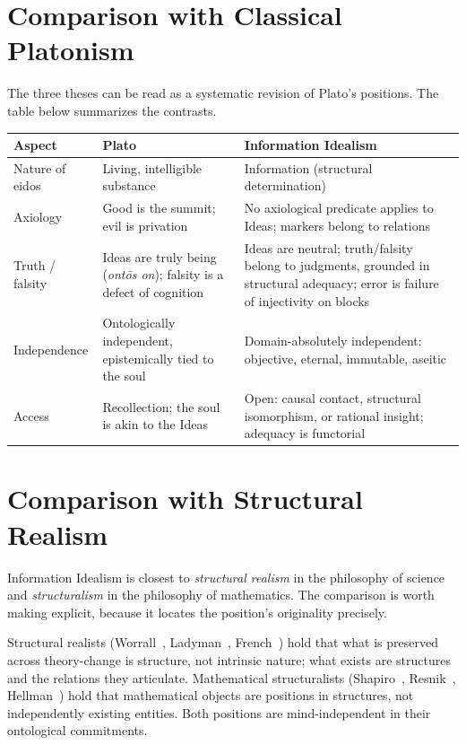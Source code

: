 \documentclass[11pt,a4paper]{article}
\theoremstyle{definition}
\theoremstyle{remark}
\begin{document}
\section{Comparison with Classical Platonism}

The three theses can be read as a systematic revision of Plato's
positions. The table below summarizes the contrasts.

\begin{center}
\renewcommand{\arraystretch}{1.25}
\begin{tabular}{p{3.2cm} p{4.6cm} p{5.6cm}}
\toprule
\textbf{Aspect} & \textbf{Plato} & \textbf{Information Idealism} \\
\midrule
Nature of eidos & Living, intelligible substance & Information (structural determination) \\
Axiology & Good is the summit; evil is privation & No axiological predicate applies to Ideas; markers belong to relations \\
Truth / falsity & Ideas are truly being (\emph{ont\=os on}); falsity is a defect of cognition & Ideas are neutral; truth/falsity belong to judgments, grounded in structural adequacy; error is failure of injectivity on blocks \\
Independence & Ontologically independent, epistemically tied to the soul & Domain-absolutely independent: objective, eternal, immutable, aseitic \\
Access & Recollection; the soul is akin to the Ideas & Open: causal contact, structural isomorphism, or rational insight; adequacy is functorial \\
\bottomrule
\end{tabular}
\end{center}

\section{Comparison with Structural Realism}

Information Idealism is closest to \emph{structural realism} in the
philosophy of science and \emph{structuralism} in the philosophy of
mathematics. The comparison is worth making explicit, because it
locates the position's originality precisely.

Structural realists (Worrall~\cite{Worrall1989},
Ladyman~\cite{Ladyman1998}, French~\cite{French2014}) hold that what
is preserved across theory-change is structure, not intrinsic nature;
what exists are structures and the relations they articulate.
Mathematical structuralists (Shapiro~\cite{Shapiro1997},
Resnik~\cite{Resnik1997}, Hellman~\cite{Hellman1989}) hold that
mathematical objects are positions in structures, not independently
existing entities. Both positions are mind-independent in their
ontological commitments.
\end{document}
